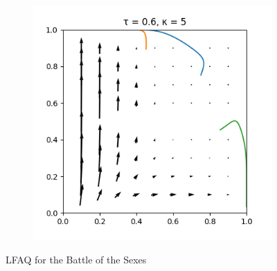 \documentclass[10pt,a4paper]{article}
\begin{document}
\begin{figure}[h]
\begin{subfigure}[b]{0.30\textwidth}
    \end{subfigure}
    \begin{subfigure}[b]{0.30\textwidth}
        \includegraphics[width=\textwidth]{Figures/boltzmann_bots_5.png}
    \end{subfigure}
    \caption{LFAQ for the Battle of the Sexes}
    \vspace*{-10mm}
    \label{fig:boltz_bots}
\end{figure}
\end{document}
